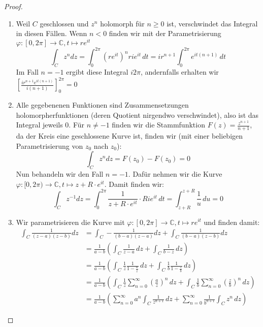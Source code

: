 \documentclass[11pt]{article}
\newcommand{\C}{\mathbb{C}}
\begin{document}
    \begin{proof}
        \begin{enumerate}[label = (\alph*)]
            \item Weil $C$ geschlossen und $z^n$ holomorph für $n\geq 0$ ist, verschwindet das Integral in diesen
            Fällen. Wenn $n< 0$ finden wir mit der Parametrisierung $\varphi: [0,2\pi]\to\C, t\mapsto re^{it}$
            $$\int_C z^n d z = \int_{0}^{2\pi} (re^{it})^n rie^{it}\,dt = ir^{n+1}\int_{0}^{2\pi} e^{it(n+1)}\,dt
            $$
            Im Fall $n=-1$ ergibt diese Integral $i2\pi$, andernfalls erhalten wir $\left[\frac{ir^{n+1}e^{it(n+1)}}
            {i(n+1)}\right]_0^{2\pi}=0$
            \item Alle gegebenenen Funktionen sind Zusammensetzungen holomorpherfunktionen (deren Quotient nirgendwo
            verschwindet), also ist das Integral jeweils $0$. Für $n\neq -1$ finden wir die Stammfunktion $F(z) = \frac{z^{n+1}}{n+1}$, da der Kreis
            eine geschlossene Kurve ist, finden wir (mit einer beliebigen Parametrisierung von $z_0$ nach
            $z_0$):
            $$\int_C z^n d z = F(z_0)-F(z_0) = 0$$
            Nun behandeln wir den Fall $n=-1$. Dafür nehmen wir die Kurve $\varphi: [0,2\pi)\to \C, t\mapsto
            z + R\cdot e^{it}$. Damit finden wir:
            $$\int_C z^{-1} d z = \int_{0}^{2\pi} \frac{1}{z + R\cdot e^{it}}\cdot Rie^{it}\,dt =
            \int_{z+R}^{z+R}\frac{1}{u}\, du = 0$$
            \item Wir parametrisieren die Kurve mit $\varphi: [0,2\pi]\to\C, t\mapsto re^{it}$ und finden damit:
            $$\begin{aligned}
                  \int_C \frac{1}{(z-a)(z-b)} d z &=\int_C -\frac{1}{(b-a)(z-a)}dz + \int_C \frac{1}{(b-a)(z-b)}dz
                  \\&= \frac{1}{a-b}\left(\int_C \frac{1}{z-a}\,dz+\int_C \frac{1}{b-z}\,dz\right)
                  \\&= \frac{1}{a-b}\left(\int_C \frac{1}{z}\frac{1}{1-\frac{a}{z}}\,dz+
                  \int_C \frac{1}{b}\frac{1}{1-\frac{z}{b}}\,dz\right)
                  \\&= \frac{1}{a-b}\left(\int_C \frac{1}{z}\sum_{n=0}^\infty \left(\frac{a}{z}\right)^n\,dz+
                  \int_C \frac{1}{b}\sum_{n=0}^\infty \left(\frac{z}{b}\right)^n\,dz\right)
                  \\&= \frac{1}{a-b}\left(\sum_{n=0}^\infty a^n \int_C \frac{1}{z^{n+1}}\,dz+
                  \sum_{n=0}^\infty\frac{1}{b^{n+1}}\int_C z^n\,dz\right)

\end{aligned}$$
\end{enumerate}
\end{proof}
\end{document}
